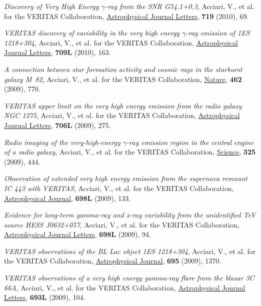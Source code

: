 \documentclass[9pt]{article}
\newcommand{\blankline}{\quad\pagebreak[2]}
\begin{document}
{\blankline{}

\textit{Discovery of Very High Energy $\gamma$-ray from the SNR G54.1+0.3}, Acciari, V., et al. for the VERITAS Collaboration, \underline{Astrophysical Journal Letters}, \textbf{719} (2010), 69.

\blankline{}

\textit{VERITAS discovery of variability in the very high energy $\gamma$-ray emission of 1ES 1218+304}, Acciari, V., et al. for the VERITAS Collaboration, \underline{Astrophysical Journal Letters}, \textbf{709L} (2010), 163.

\blankline{}

\textit{A connection between star formation activity and cosmic rays in the starburst galaxy M~82}, Acciari, V., et al. for the VERITAS Collaboration, \underline{Nature}, \textbf{462} (2009), 770.

\blankline{}


\textit{VERITAS upper limit on the very high energy emission from the radio galaxy NGC 1275}, Acciari, V., et al. for the VERITAS Collaboration, \underline{Astrophysical Journal Letters}, \textbf{706L} (2009), 275. 

\blankline{}

\textit{Radio imaging of the very-high-energy $\gamma$-ray emission region in the central engine of a radio galaxy}, Acciari, V., et al. for the VERITAS Collaboration, \underline{Science}, \textbf{325} (2009), 444.


\blankline{}

\textit{Observation of extended very high energy emission from the supernova remnant IC 443 with VERITAS}, Acciari, V., et al. for the VERITAS Collaboration, \underline{Astrophysical Journal}, \textbf{698L} (2009), 133.

\blankline{}


\textit{Evidence for long-term gamma-ray and x-ray variability from the unidentified TeV source HESS J0632+057}, Acciari, V., et al. for the VERITAS Collaboration, \\\underline{Astrophysical Journal Letters}, \textbf{698L} (2009), 94.

\blankline{}


\textit{VERITAS observations of the BL Lac object 1ES 1218+304}, Acciari, V., et al. for the VERITAS Collaboration, \underline{Astrophysical Journal}, \textbf{695} (2009), 1370.

\blankline{}

\textit{VERITAS observations of a very high energy gamma-ray flare from the blazar 3C 66A}, Acciari, V., et al. for the VERITAS Collaboration, \underline{Astrophysical Journal Letters}, \textbf{693L} (2009), 104.

}
\end{document}
